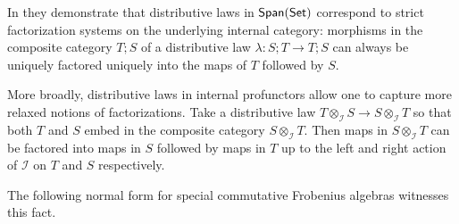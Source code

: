 %
%
%
%
%
%



In \cite{???} they demonstrate that distributive laws in $\mathsf{Span}(\mathsf{Set})$ correspond to strict factorization systems on the underlying internal category:  morphisms in the composite category $T;S$ of a distributive law $\lambda:S;T\to T;S$ can always be uniquely factored uniquely into the maps of $T$ followed by $S$.  

More broadly, distributive laws in internal profunctors allow one to capture more relaxed notions of factorizations. Take a distributive law $T\otimes_{\mathcal I} S\to S \otimes_{\mathcal I } T$ so that both $T$ and $S$ embed in the composite category $S\otimes_{\mathcal I} T$.  Then maps in $S\otimes_{\mathcal I} T$ can be factored into maps in $S$ followed by maps in $T$ up to the left and right action of $\mathcal I$ on $T$ and $S$ respectively. 

The following normal form for special commutative Frobenius algebras witnesses this fact. 

